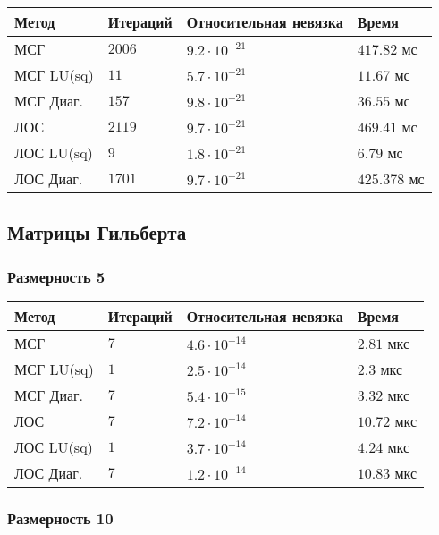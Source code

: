 \setlength{\tabcolsep}{2pt}
\tabulinesep=0.3mm
\noindent\begin{tabu}{|X[-1,l]|X[-1,l]|X[-1,l]|X[-1,l]|}
\hline
Метод & Итераций & Относительная невязка & Время \\ \hline
МСГ & $2006$ & $9.2\cdot 10^{-21}$ & $417.82$ мс \\ \hline
МСГ LU(sq) & $11$ & $5.7 \cdot 10^{-21}$ & $11.67$ мс \\ \hline
МСГ Диаг. & $157$ & $9.8 \cdot 10^{-21}$ & $36.55$ мс \\ \hline
ЛОС & $2119$ & $9.7 \cdot 10^{-21}$ & $469.41$ мс \\ \hline
{}
ЛОС LU(sq) & $9$ & $1.8 \cdot 10^{-21}$ & $6.79$ мс \\ \hline
ЛОС Диаг. & $1701$ & $9.7 \cdot 10^{-21}$ & $425.378$ мс \\ \hline
\end{tabu}

\subsection{Матрицы Гильберта}

\subsubsection{Размерность 5}

\setlength{\tabcolsep}{2pt}
\tabulinesep=0.3mm
\noindent\begin{tabu}{|X[-1,l]|X[-1,l]|X[-1,l]|X[-1,l]|}
\hline
Метод & Итераций & Относительная невязка & Время \\ \hline
МСГ & $7$ & $4.6 \cdot 10^{-14}$ & $2.81$ мкс \\ \hline
{}
МСГ LU(sq) & $1$ & $2.5 \cdot 10^{-14}$ & $2.3$ мкс \\ \hline
МСГ Диаг. & $7$ & $5.4 \cdot 10^{-15}$ & $3.32$ мкс \\ \hline
ЛОС & $7$ & $7.2 \cdot 10^{-14}$ & $10.72$ мкс \\ \hline
ЛОС LU(sq) & $1$ & $3.7 \cdot 10^{-14}$ & $4.24$ мкс \\ \hline
ЛОС Диаг. & $7$ & $1.2 \cdot 10^{-14}$ & $10.83$ мкс \\ \hline
\end{tabu}

\subsubsection{Размерность 10}

